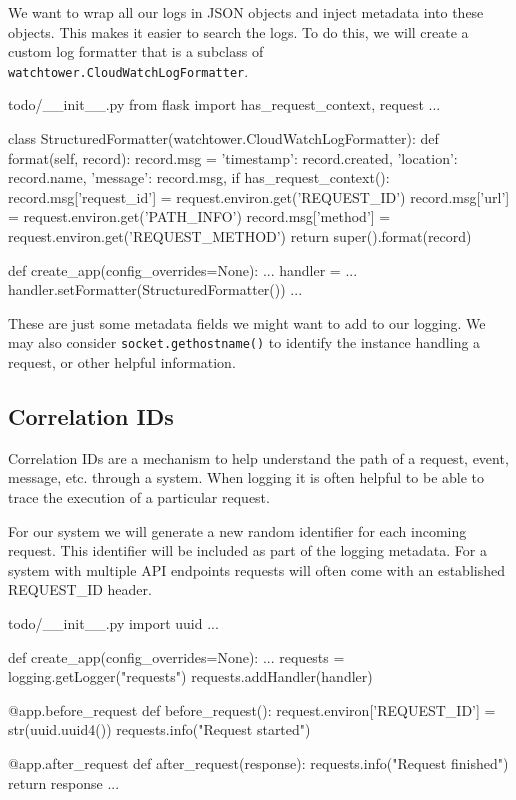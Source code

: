 \documentclass{csse4400}
\begin{document}
We want to wrap all our logs in JSON objects and inject metadata into these objects.
This makes it easier to search the logs.
To do this, we will create a custom log formatter that is a subclass of \\
\texttt{watchtower.CloudWatchLogFormatter}.
%
\begin{code}[language=python,numbers=none]{todo/\_\_init\_\_.py}
from flask import has_request_context, request
...

class StructuredFormatter(watchtower.CloudWatchLogFormatter):
    def format(self, record):
        record.msg = {
            'timestamp': record.created,
            'location': record.name,
            'message': record.msg,
        }
        if has_request_context():
            record.msg['request_id'] = request.environ.get('REQUEST_ID')
            record.msg['url'] = request.environ.get('PATH_INFO')
            record.msg['method'] = request.environ.get('REQUEST_METHOD')
        return super().format(record)

def create_app(config_overrides=None): 
    ...
    handler = ...
    handler.setFormatter(StructuredFormatter())
    ...
\end{code}

These are just some metadata fields we might want to add to our logging.
We may also consider \texttt{socket.gethostname()} to identify the instance handling a request,
or other helpful information.

\subsection{Correlation IDs}

Correlation IDs are a mechanism to help understand the path of a request, event, message, etc. through a system.
When logging it is often helpful to be able to trace the execution of a particular request.

For our system we will generate a new random identifier for each incoming request.
This identifier will be included as part of the logging metadata.
For a system with multiple API endpoints requests will often come with an established REQUEST\_ID header.
%
\begin{code}[language=python,numbers=none]{todo/\_\_init\_\_.py}
import uuid
...

def create_app(config_overrides=None): 
    ...
    requests = logging.getLogger("requests")
    requests.addHandler(handler)

    @app.before_request
    def before_request():
        request.environ['REQUEST_ID'] = str(uuid.uuid4())
        requests.info("Request started")

    @app.after_request
    def after_request(response):
        requests.info("Request finished")
        return response
    ...
\end{code}
\end{document}
